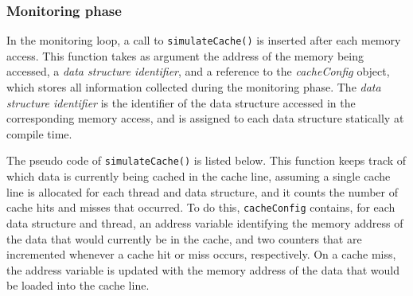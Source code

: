 %



%
%
%
%
%
%
%
%

\subsubsection{Monitoring phase}
In the monitoring loop, a call to \texttt{simulateCache()} is inserted after each memory access.
This function takes as argument the address of the memory being accessed, a {\it data structure identifier},
and a reference to the {\it cacheConfig} object, which stores all information collected during the
monitoring phase.
The {\it data structure identifier} is the identifier of the data structure accessed in the
corresponding memory access, and 
is assigned to each data structure statically at compile time.

The pseudo code of \texttt{simulateCache()} is listed below. 
This function keeps track of which data is currently being cached in the cache line,
assuming a single cache line is allocated for each thread and data structure,
and it counts the number of cache hits and misses that occurred.
To do this, \texttt{cacheConfig} contains, for each data structure and thread, an address variable
identifying the memory address of the data that would currently be in the cache,
and two counters that are incremented whenever a cache hit or miss occurs, respectively.
On a cache miss, the address variable is updated with the memory address of the data that would be
loaded into the cache line.

